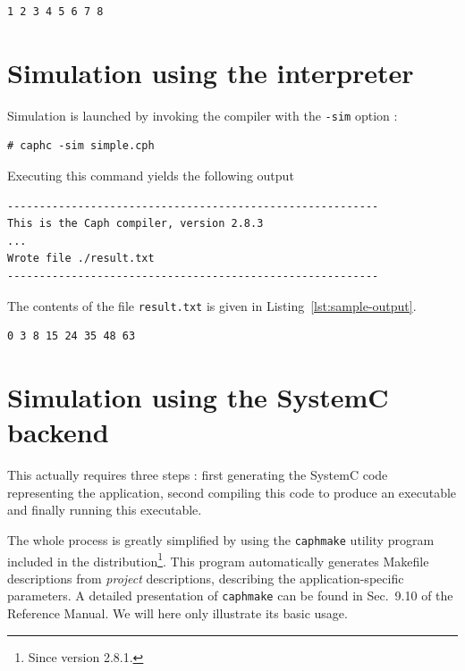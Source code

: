 \begin{lstlisting}[language=bash,frame=tb,caption={The input file \texttt{sample.txt} used for
    simulating the program of Listing~\ref{lst:simple-full}},label={lst:sample-input}]
1 2 3 4 5 6 7 8
\end{lstlisting}

\section{Simulation using the interpreter}
\label{sec:simul-using-interpr}

Simulation is launched by invoking the compiler with the \verb|-sim| option :

\begin{lstlisting}[style=BashInputStyle]
# caphc -sim simple.cph
\end{lstlisting}

Executing this command yields the following output 

\begin{lstlisting}[style=BashOutputStyle]
----------------------------------------------------------
This is the Caph compiler, version 2.8.3
...
Wrote file ./result.txt
----------------------------------------------------------
\end{lstlisting}

The contents of the file \verb|result.txt| is given in Listing~\ref{lst:sample-output}.

\begin{lstlisting}[language=bash,frame=tb,caption={The output file \texttt{result.txt} generated
    when simulating the program of Listing~\ref{lst:simple-full} with the input file of
    Listing~\ref{lst:sample-input}},label={lst:sample-output}]
0 3 8 15 24 35 48 63
\end{lstlisting}

\section{Simulation using the SystemC backend}
\label{sec:simul-using-syst}

This actually requires three steps : first generating the SystemC code representing the
application, second compiling this code to produce an executable and finally running this
executable.

The whole process is greatly simplified by using the \verb|caphmake| utility program included in
the distribution\footnote{Since version 2.8.1.}. This program automatically generates Makefile
descriptions from \emph{project} descriptions, describing the application-specific parameters. A
detailed presentation of \texttt{caphmake} can be found in Sec.~9.10 of the Reference Manual. We
will here only illustrate its basic usage.

